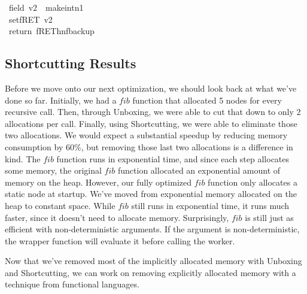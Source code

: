 \documentclass{book}
\theoremstyle{definition}
\newcommand{\Varid}[1]{\mathit{#1}}
\begin{document}
\begin{tabbing}\ttfamily
~field~v2~~makeintn1\\
\ttfamily ~setfRET~v2\\
\ttfamily ~return~fREThnfbackup
\end{tabbing}

\subsection{Shortcutting Results}

Before we move onto our next optimization, we should look back at what we've done so far.
Initially, we had a \ensuremath{\Varid{fib}} function that allocated 5 nodes for every recursive call.
Then, through Unboxing, we were able to cut that down to only 2 allocations per call.
Finally, using Shortcutting, we were able to eliminate those two allocations.
We would expect a substantial speedup by reducing memory consumption by 60\%,
but removing those last two allocations is a difference in kind.
The \ensuremath{\Varid{fib}} function runs in exponential time,
and since each step allocates some memory, the original \ensuremath{\Varid{fib}} function
allocated an exponential amount of memory on the heap.
However, our fully optimized \ensuremath{\Varid{fib}} function only allocates a static node at startup.
We've moved from exponential memory allocated on the heap to constant space.
While \ensuremath{\Varid{fib}} still runs in exponential time,
it runs much faster, since it doesn't need to allocate memory.
Surprisingly, \ensuremath{\Varid{fib}} is still just as efficient with non-deterministic arguments.
If the argument is non-deterministic, the wrapper function will evaluate it
before calling the worker.

Now that we've removed most of the implicitly allocated memory
with Unboxing and Shortcutting, 
we can work on removing explicitly allocated memory
with a technique from functional languages.
\end{document}
